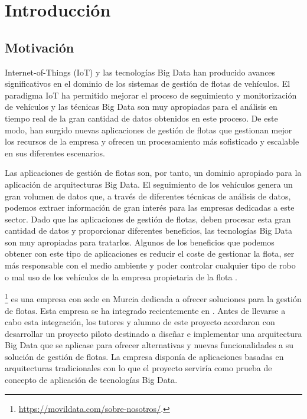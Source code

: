 
\chapter{Introducción\label{intro}}

\section{Motivación\label{motivacion}}

Internet-of-Things (IoT) y las tecnologías Big Data han producido
avances significativos en el dominio de los sistemas de gestión de
flotas de vehículos. El paradigma IoT ha permitido mejorar el proceso
de seguimiento y monitorización de vehículos y las técnicas Big Data
son muy apropiadas para el análisis en tiempo real de la gran cantidad
de datos obtenidos en este proceso\cite{1-1-3}. De este modo, han
surgido nuevas aplicaciones de gestión de flotas que gestionan mejor
los recursos de la empresa y ofrecen un procesamiento más sofisticado
y escalable en sus diferentes escenarios.


Las aplicaciones de gestión de flotas son, por tanto, un dominio
apropiado para la aplicación de arquitecturas Big Data. El seguimiento
de los vehículos genera un gran volumen de datos que, a través de
diferentes técnicas de análisis de datos, podemos extraer información
de gran interés para las empresas dedicadas a este sector. Dado que
las aplicaciones de gestión de flotas, deben procesar esta gran
cantidad de datos y proporcionar diferentes beneficios, las
tecnologías Big Data son muy apropiadas para tratarlos. Algunos de los
beneficios que podemos obtener con este tipo de aplicaciones es
reducir el coste de gestionar la flota, ser más responsable con el
medio ambiente y poder controlar cualquier tipo de robo o mal uso de
los vehículos de la empresa propietaria de la flota \cite{1-1-1,1-1-2}.

\mdata\footnote{\url{https://movildata.com/sobre-nosotros/}.} es
una empresa con sede en Murcia dedicada a ofrecer soluciones para la
gestión de flotas. Esta empresa se ha integrado recientemente en
\vzconnect. Antes de llevarse a cabo esta integración, los
tutores y alumno de este proyecto acordaron con \mdata{} desarrollar
un proyecto piloto destinado a diseñar e implementar una arquitectura
Big Data que se aplicase para ofrecer alternativas y nuevas
funcionalidades a su solución de gestión de flotas. La empresa
disponía de aplicaciones basadas en arquitecturas tradicionales con lo
que el proyecto serviría como prueba de concepto de aplicación de
tecnologías Big Data.

